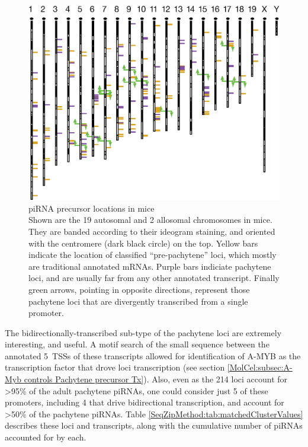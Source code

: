     \begin{figure} %
      \centering 
      \includegraphics{Figures/SeqZipMethod/PrecursorLocations.eps}
      \caption[Pachytene piRNA precursor locations in mice]
      {
        piRNA precursor locations in mice\\[0.25cm]
        Shown are the 19 autosomal and 2 allosomal chromosomes in mice. They are banded according to their ideogram staining, and oriented with the centromere (dark black circle) on the top. Yellow bars indicate the location of classified ``pre-pachytene'' loci, which mostly are traditional annotated mRNAs. Purple bars indiciate pachytene loci, and are usually far from any other annotated transcript. Finally green arrows, pointing in opposite directions, represent those pachytene loci that are divergently transcribed from a single promoter.
     	 }
      \label{SeqZipMethod:fig:precursor Loci Locations}
      \end{figure}

    The bidirectionally-transcribed sub-type of the pachytene loci are extremely interesting, and useful. A motif search of the small sequence between the annotated 5\textprime~TSSs of these transcripts allowed for identification of A-MYB as the transcription factor that drove loci transcription (see section \ref{MolCel:subsec:A-Myb controls Pachytene precursor Tx}). Also, even as the 214 loci account for >95\% of the adult pachytene piRNAs, one could consider just 5 of these promoters, including 4 that drive bidirectional transcription, and account for >50\% of the pachytene piRNAs. Table \ref{SeqZipMethod:tab:matchedClusterValues} describes these loci and transcripts, along with the cumulative number of piRNAs accounted for by each.

